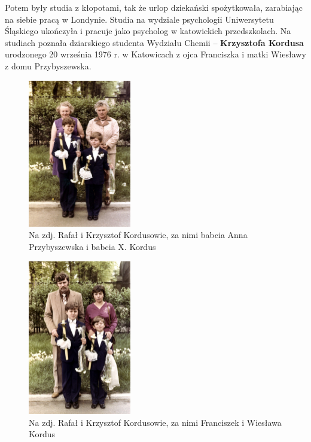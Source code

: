 Potem były studia z kłopotami, tak że urlop dziekański spożytkowała, zarabiając na siebie pracą w Londynie. Studia na wydziale psychologii Uniwersytetu Śląskiego ukończyła i pracuje jako psycholog w katowickich przedszkolach. Na studiach poznała dziarskiego studenta Wydziału Chemii – \textbf{Krzysztofa Kordusa} urodzonego 20 września 1976 r. w Katowicach z ojca Franciszka i matki Wiesławy z domu Przybyszewska.
\begin{figure}[!h]
\begin{center}
\includegraphics[width=0.4\textwidth]{photo/krzysztof_kordus_komunia.jpg}
\caption[I Komunia św. Kordusów z babciami]{Na zdj. Rafał i Krzysztof Kordusowie, za nimi babcia Anna Przybyszewska i babcia X. Kordus}
\end{center}
\end{figure}

\begin{figure}[!h]
\begin{center}
\includegraphics[width=0.4\textwidth]{photo/krzysztof_kordus_komunia_2.jpg}
\caption[I Komunia św. Kordusów z rodzicami]{Na zdj. Rafał i Krzysztof Kordusowie, za nimi Franciszek i Wiesława Kordus}
\end{center}
\end{figure}

